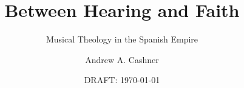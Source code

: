 \title{Between Hearing and Faith}
\subtitle{Musical Theology in the Spanish Empire}
\author{Andrew A. Cashner}
\date{DRAFT: \today}
\endinput

